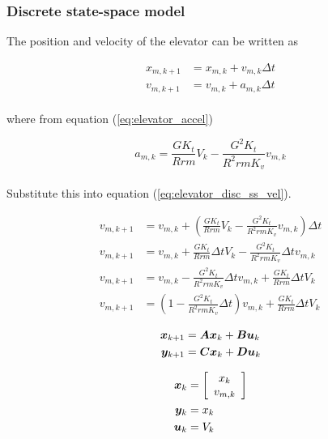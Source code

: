 \subsubsection{Discrete state-space model}

The position and velocity of the elevator can be written as

\begin{align}
  x_{m,k+1} &= x_{m,k} + v_{m,k} \Delta t \label{eq:elevator_disc_ss_pos} \\
  v_{m,k+1} &= v_{m,k} + a_{m,k} \Delta t \label{eq:elevator_disc_ss_vel}
\end{align}
\\
where from equation (\ref{eq:elevator_accel})

\begin{equation*}
  a_{m,k} = \frac{GK_t}{Rrm} V_k - \frac{G^2 K_t}{R^2 rm K_v} v_{m,k}
\end{equation*}
\\
Substitute this into equation (\ref{eq:elevator_disc_ss_vel}).

\begin{align}
  v_{m,k+1} &= v_{m,k} + \left(\frac{GK_t}{Rrm} V_k -
    \frac{G^2 K_t}{R^2 rm K_v} v_{m,k}\right) \Delta t \nonumber \\
  v_{m,k+1} &= v_{m,k} + \frac{GK_t}{Rrm} \Delta t V_k -
    \frac{G^2 K_t}{R^2 rm K_v} \Delta t v_{m,k} \nonumber \\
  v_{m,k+1} &= v_{m,k} - \frac{G^2 K_t}{R^2 rm K_v} \Delta t v_{m,k} +
    \frac{GK_t}{Rrm} \Delta t V_k \nonumber \\
  v_{m,k+1} &= \left(1 - \frac{G^2 K_t}{R^2 rm K_v} \Delta t\right) v_{m,k} +
    \frac{GK_t}{Rrm} \Delta t V_k
\end{align}

\begin{align*}
  \bm x_{k+1} &= \bm A \bm x_k + \bm B \bm u_k \\
  \bm y_{k+1} &= \bm C \bm x_k + \bm D \bm u_k
\end{align*}

\begin{align*}
  \bm x_k &= \left[
  \begin{array}{c}
    x_k \\
    v_{m,k}
  \end{array}
  \right] \\
  \bm y_k &= x_k \\
  \bm u_k &= V_k
\end{align*}

